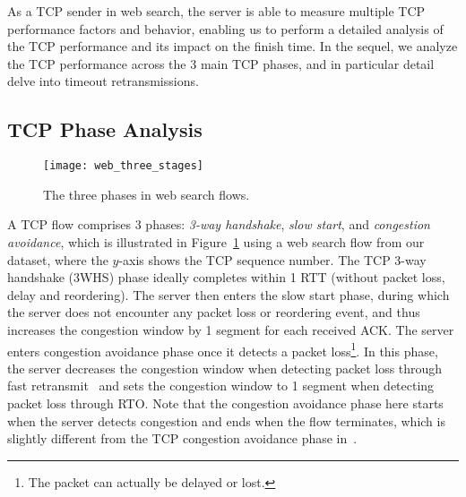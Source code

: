 %

As a TCP sender in web search, the server is able to measure multiple TCP performance factors and behavior, enabling us to perform a detailed analysis of the TCP performance and its impact on the finish time. In the sequel, we analyze the TCP performance across the 3 main TCP phases, and in particular detail delve into timeout retransmissions.

\subsection{TCP Phase Analysis}

\begin{figure}[th]
\centering
\texttt{[image: web\_three\_stages]}
\caption{The three phases in web search flows.}
\label{fig:web_three_stages}
\end{figure}

A TCP flow comprises 3 phases: \emph{3-way handshake}, \emph{slow start}, and \emph{congestion avoidance}, which is illustrated in Figure~\ref{fig:web_three_stages} using a web search flow from our dataset, where the $y$-axis shows the TCP sequence number. The TCP 3-way handshake (3WHS) phase ideally completes within 1 RTT (\ie without packet loss, delay and reordering). The server then enters the slow start phase, during which the server does not encounter any packet loss or reordering event, and thus increases the congestion window by 1 segment for each received ACK. The server enters congestion avoidance phase once it detects a packet loss\footnote{The packet can actually be delayed or lost.}. In this phase, the server decreases the congestion window when detecting packet loss through fast retransmit~\cite{rfc6675} and sets the congestion window to 1 segment when detecting packet loss through RTO. Note that the congestion avoidance phase here starts when the server detects congestion and ends when the flow terminates, which is slightly different from the TCP congestion avoidance phase in~\cite{jacobson1988congestion}.

